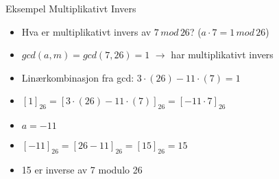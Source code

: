 \begin{frame}{Eksempel Multiplikativt Invers}
\begin{itemize}[<+->]
\item Hva er multiplikativt invers av $7\, mod\, 26$? ($a\cdot 7=1\, mod\, 26$)
\item $gcd(a,m) = gcd(7,26)=1$ $\rightarrow$ har multiplikativt invers
\item Linærkombinasjon fra gcd: $3\cdot (26)-11\cdot (7)=1$
\item $[1]_{26}=[3\cdot (26)-11\cdot (7)]_{26}=[-11\cdot 7]_{26}$
\item $a=-11$
\item $[-11]_{26}=[26-11]_{26}=[15]_{26}=15$
\item 15 er inverse av 7 modulo 26

\end{itemize}
\end{frame}